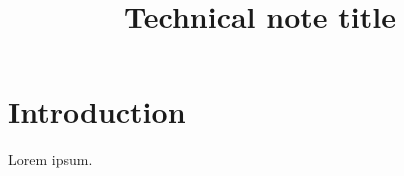 \documentclass[TN]{spherex}
\title{Technical note title}
\begin{document}
\maketitle

\section{Introduction}

Lorem ipsum.
\end{document}
